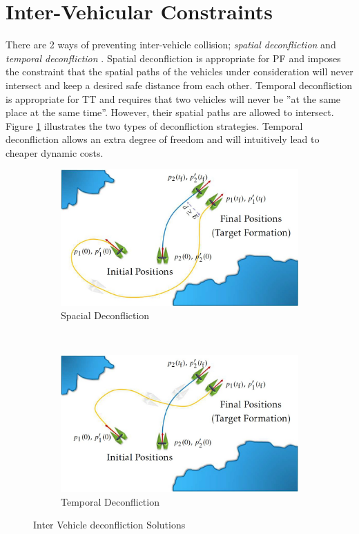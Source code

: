 \section{Inter-Vehicular Constraints}
\label{sec:mindistintveh}

\par There are 2 ways of preventing inter-vehicle collision; \textit{spatial deconfliction} and \textit{temporal deconfliction} \cite{hausler2015mission}.
Spatial deconfliction is appropriate for \ac{PF} and imposes the constraint that the spatial paths of the vehicles under consideration will never intersect and keep a desired safe distance from each other. Temporal deconfliction is appropriate for \ac{TT} and requires that two vehicles will never be ”at the same place at the same time”. However, their spatial paths are allowed to intersect. Figure \ref{fig:deconfliction} illustrates the two types of deconfliction strategies. Temporal deconfliction allows an extra degree of freedom and will intuitively lead to cheaper dynamic costs.

\begin{figure}
    \centering
    \begin{subfigure}[b]{0.45\textwidth}
        \includegraphics[width=\textwidth]{Images/spacial_deconf.jpg}
        \caption{Spacial Deconfliction}
    \end{subfigure}
    ~
    \begin{subfigure}[b]{0.45\textwidth}
        \includegraphics[width=\textwidth]{Images/temporal_deconf.jpg}
        \caption{Temporal Deconfliction}
    \end{subfigure}
    \caption{Inter Vehicle deconfliction Solutions}
    \label{fig:deconfliction}
\end{figure}

